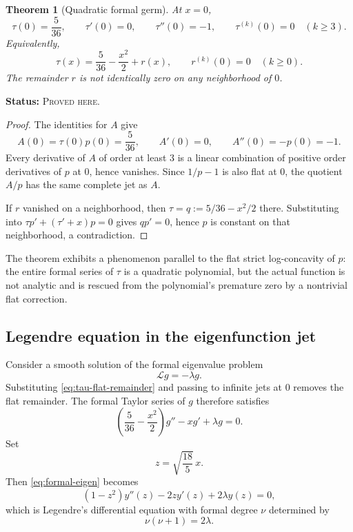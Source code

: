 \documentclass[11pt,oneside]{article}
\newtheorem{theorem}{Theorem}[section]
\theoremstyle{definition}
\theoremstyle{remark}
\newcommand{\ProvedHere}{\textcolor{statusgreen}{\textsc{Proved here}}}
\newcommand{\Status}[1]{\par\smallskip\noindent\textbf{Status:} #1.\par\smallskip}
\begin{document}
\begin{theorem}[Quadratic formal germ]\label{thm:tau-center-jet}
At $x=0$,
\begin{equation}\label{eq:tau-center-jet}
 \tau(0)=\frac5{36},\qquad
 \tau'(0)=0,\qquad
 \tau''(0)=-1,\qquad
 \tau^{(k)}(0)=0\quad(k\ge3).
\end{equation}
Equivalently,
\begin{equation}\label{eq:tau-flat-remainder}
 \tau(x)=\frac5{36}-\frac{x^2}{2}+r(x),
 \qquad r^{(k)}(0)=0\quad(k\ge0).
\end{equation}
The remainder $r$ is not identically zero on any neighborhood of $0$.
\end{theorem}
\Status{\ProvedHere}

\begin{proof}
The identities for $A$ give
\[
 A(0)=\tau(0)p(0)=\frac5{36},\qquad
 A'(0)=0,
 \qquad A''(0)=-p(0)=-1.
\]
Every derivative of $A$ of order at least $3$ is a linear combination of positive
order derivatives of $p$ at $0$, hence vanishes.  Since $1/p-1$ is also flat at
$0$, the quotient $A/p$ has the same complete jet as $A$.

If $r$ vanished on a neighborhood, then $\tau=q:=5/36-x^2/2$ there.  Substituting
into $\tau p'+(\tau'+x)p=0$ gives $q p'=0$, hence $p$ is constant on that
neighborhood, a contradiction.
\end{proof}

The theorem exhibits a phenomenon parallel to the flat strict log-concavity of
$p$: the entire formal series of $\tau$ is a quadratic polynomial, but the actual
function is not analytic and is rescued from the polynomial's premature zero by a
nontrivial flat correction.

\subsection{Legendre equation in the eigenfunction jet}
Consider a smooth solution of the formal eigenvalue problem
\begin{equation}\label{eq:eigenproblem}
 \mathcal Lg=-\lambda g.
\end{equation}
Substituting \eqref{eq:tau-flat-remainder} and passing to infinite jets at $0$
removes the flat remainder.  The formal Taylor series of $g$ therefore satisfies
\begin{equation}\label{eq:formal-eigen}
 \left(\frac5{36}-\frac{x^2}{2}\right)g''-xg'+\lambda g=0.
\end{equation}
Set
\begin{equation}\label{eq:legendre-scale}
 z=\sqrt{\frac{18}{5}}\,x.
\end{equation}
Then \eqref{eq:formal-eigen} becomes
\begin{equation}\label{eq:legendre-shadow}
 (1-z^2)y''(z)-2zy'(z)+2\lambda y(z)=0,
\end{equation}
which is Legendre's differential equation with formal degree $\nu$ determined by
\begin{equation}\label{eq:nu-lambda}
 \nu(\nu+1)=2\lambda.
\end{equation}
\end{document}
